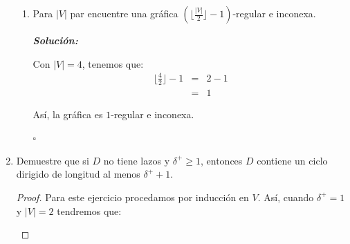 \documentclass{article}
\begin{document}
\begin{enumerate}
\begin{enumerate}
    \item Para $|V|$ par encuentre una gr\'afica $(\lfloor \frac{|V|}{2}
      \rfloor -1)$-regular e inconexa.

      \textbf{\textit{Solución:}}

      Con $|V| = 4$, tenemos que:
      \begin{eqnarray*}
        \lfloor \frac{4}{2} \rfloor -1 &=& 2 -1\\
        &=& 1
      \end{eqnarray*}

      \begin{figure}[ht!]
        \centering
      \end{figure}

      Así, la gráfica es $1$-regular e inconexa.

      \hfill $\square$
  \end{enumerate}

  \item Demuestre que si $D$ no tiene lazos y $\delta^+ \ge 1$, entonces $D$
    contiene un ciclo dirigido de longitud al menos $\delta^+ + 1$.

    \renewcommand\qedsymbol{QED}
    \begin{proof}
      Para este ejercicio procedamos por inducción en $V$.
      Así, cuando $\delta^+ = 1$ y $|V| = 2$ tendremos que:

      \begin{center}
      \end{center}


\end{proof}
\end{enumerate}
\end{document}
